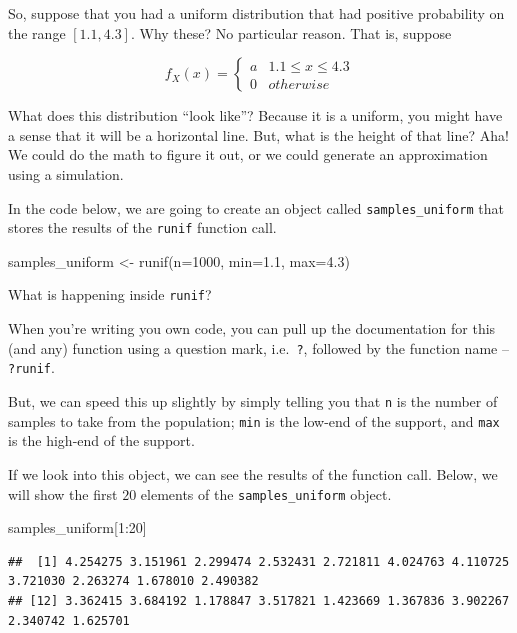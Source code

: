 \documentclass[
]{book}
\newenvironment{Shaded}{\begin{snugshade}}{\end{snugshade}}
\newcommand{\AttributeTok}[1]{\textcolor[rgb]{0.77,0.63,0.00}{#1}}
\newcommand{\DecValTok}[1]{\textcolor[rgb]{0.00,0.00,0.81}{#1}}
\newcommand{\FloatTok}[1]{\textcolor[rgb]{0.00,0.00,0.81}{#1}}
\newcommand{\FunctionTok}[1]{\textcolor[rgb]{0.00,0.00,0.00}{#1}}
\newcommand{\NormalTok}[1]{#1}
\newcommand{\OtherTok}[1]{\textcolor[rgb]{0.56,0.35,0.01}{#1}}
\newcommand{\SpecialCharTok}[1]{\textcolor[rgb]{0.00,0.00,0.00}{#1}}
\theoremstyle{definition}
\theoremstyle{definition}
\theoremstyle{definition}
\theoremstyle{definition}
\theoremstyle{remark}
\begin{document}
So, suppose that you had a uniform distribution that had positive probability on the range \([1.1, 4.3]\). Why these? No particular reason. That is, suppose

\[
  f_{X}(x) = \begin{cases} 
    a & 1.1 \leq x \leq 4.3 \\ 
    0 & otherwise
  \end{cases}
\]

What does this distribution ``look like''? Because it is a uniform, you might have a sense that it will be a horizontal line. But, what is the height of that line? Aha! We could do the math to figure it out, or we could generate an approximation using a simulation.

In the code below, we are going to create an object called \texttt{samples\_uniform} that stores the results of the \texttt{runif} function call.

\begin{Shaded}
\begin{Highlighting}[]
\NormalTok{samples\_uniform }\OtherTok{\textless{}{-}} \FunctionTok{runif}\NormalTok{(}\AttributeTok{n=}\DecValTok{1000}\NormalTok{, }\AttributeTok{min=}\FloatTok{1.1}\NormalTok{, }\AttributeTok{max=}\FloatTok{4.3}\NormalTok{)}
\end{Highlighting}
\end{Shaded}

What is happening inside \texttt{runif}?

When you're writing you own code, you can pull up the documentation for this (and any) function using a question mark, i.e.~\texttt{?}, followed by the function name -- \texttt{?runif}.

But, we can speed this up slightly by simply telling you that \texttt{n} is the number of samples to take from the population; \texttt{min} is the low-end of the support, and \texttt{max} is the high-end of the support.

If we look into this object, we can see the results of the function call. Below, we will show the first \(20\) elements of the \texttt{samples\_uniform} object.

\begin{Shaded}
\begin{Highlighting}[]
\NormalTok{samples\_uniform[}\DecValTok{1}\SpecialCharTok{:}\DecValTok{20}\NormalTok{]}
\end{Highlighting}
\end{Shaded}

\begin{verbatim}
##  [1] 4.254275 3.151961 2.299474 2.532431 2.721811 4.024763 4.110725 3.721030 2.263274 1.678010 2.490382
## [12] 3.362415 3.684192 1.178847 3.517821 1.423669 1.367836 3.902267 2.340742 1.625701
\end{verbatim}
\end{document}

